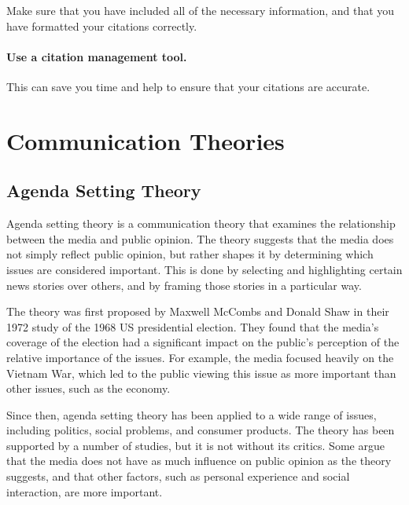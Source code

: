 \documentclass[
  b5paper]{book}
\begin{document}
Make sure that you have included all of the necessary information, and that you have formatted your citations correctly.

\hypertarget{use-a-citation-management-tool.}{%
\subsubsection*{Use a citation management tool.}\label{use-a-citation-management-tool.}}

This can save you time and help to ensure that your citations are accurate.

\hypertarget{communication-theories-1}{%
\chapter{Communication Theories}\label{communication-theories-1}}

\hypertarget{agenda-setting-theory}{%
\section{Agenda Setting Theory}\label{agenda-setting-theory}}

Agenda setting theory is a communication theory that examines the relationship between the media and public opinion. The theory suggests that the media does not simply reflect public opinion, but rather shapes it by determining which issues are considered important. This is done by selecting and highlighting certain news stories over others, and by framing those stories in a particular way.

The theory was first proposed by Maxwell McCombs and Donald Shaw in their 1972 study of the 1968 US presidential election. They found that the media's coverage of the election had a significant impact on the public's perception of the relative importance of the issues. For example, the media focused heavily on the Vietnam War, which led to the public viewing this issue as more important than other issues, such as the economy.

Since then, agenda setting theory has been applied to a wide range of issues, including politics, social problems, and consumer products. The theory has been supported by a number of studies, but it is not without its critics. Some argue that the media does not have as much influence on public opinion as the theory suggests, and that other factors, such as personal experience and social interaction, are more important.
\end{document}
